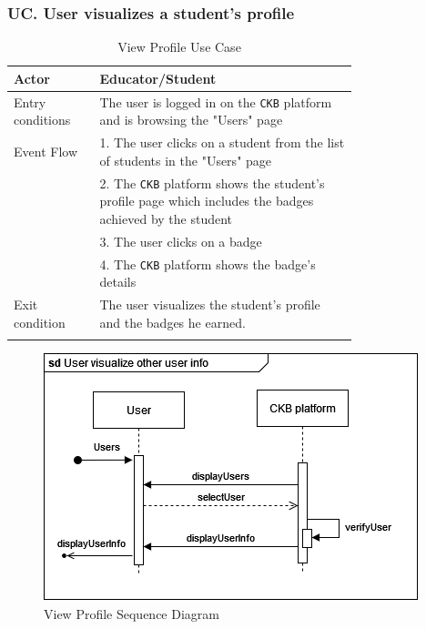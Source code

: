 \subsubsection*{UC\cuc . User visualizes a student's profile}
\begin{center}
    \begin{longtable}{lp{0.75\linewidth}}
        \hline
        Actor            & Educator/Student \\
        \hline
        Entry conditions & The user is logged in on the \verb|CKB| platform and is browsing the "Users" page\\
        \hline
        Event Flow      
        & 1. The user clicks on a student from the list of students in the "Users" page\\
        & 2. The \verb|CKB| platform shows the student's profile page which includes the badges achieved by the student\\
        & 3. The user clicks on a badge\\
        & 4. The \verb|CKB| platform shows the badge's details\\
        \hline
        Exit condition   & The user visualizes the student's profile and the badges he earned.   \\ 
        \hline
        \caption{View Profile Use Case}
        \label{tab: view_profile_use_case}
    \end{longtable}

    \begin{figure} [H]
        \begin{center}
            \includegraphics[width=0.9\linewidth]{Images/SequenceDiagrams/SD_18.png}
            \caption{View Profile Sequence Diagram}
            \label{fig: view_profile_seq_diag}
        \end{center}
    \end{figure}
\end{center}


